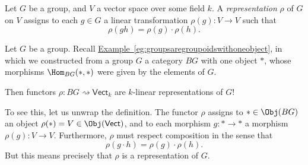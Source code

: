 \documentclass[main.tex]{subfiles}
\begin{document}
\begin{example}
  \label{eg:functorscanbegrouprepresentation}
  Let $G$ be a group, and $V$ a vector space over some field $k$. A \emph{representation} $\rho$ of $G$ on $V$ assigns to each $g \in G$ a linear transformation $\rho(g)\colon V \to V$ such that
  \begin{equation*}
    \rho(gh) = \rho(g)\cdot \rho(h).
  \end{equation*}

  Let $G$ be a group. Recall \hyperref[eg:groupsaregroupoidswithoneobject]{Example~\ref*{eg:groupsaregroupoidswithoneobject}}, in which we constructed from a group $G$ a category $BG$ with one object $*$, whose morphisms $\Hom_{BG}(*, *)$ were given by the elements of $G$.

  Then functors $\rho\colon BG \rightsquigarrow \mathsf{Vect}_{k}$ are $k$-linear representations of $G$!

  To see this, let us unwrap the definition. The functor $\rho$ assigns to $* \in \Obj(BG)$ an object $\rho(*) = V \in \Obj(\mathsf{Vect})$, and to each morphism $g\colon * \to *$ a morphism $\rho(g)\colon V \to V$. Furthermore, $\rho$ must respect composition in the sense that
  \begin{equation*}
    \rho(g\cdot h) = \rho(g)\cdot \rho(h).
  \end{equation*}
  But this means precisely that $\rho$ is a representation of $G$.
\end{example}
\end{document}
